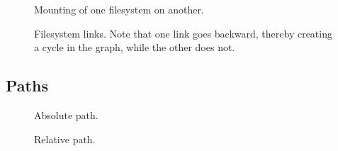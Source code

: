 
\begin{figure}[tbp]
  \begin{center}
  \end{center}
  \caption{Mounting of one filesystem on another.}
  \label{fig:topics:fs:mount}
\end{figure}


\begin{figure}[tbp]
  \begin{center}
  \end{center}
  \caption[Filesystem links]{Filesystem links. Note that one link goes backward, thereby creating a cycle in the graph, while the other does not.}
  \label{fig:topics:fs:links}
\end{figure}

\subsection{Paths}


\begin{figure}[tbp]
  \begin{center}
  \end{center}
  \caption{Absolute path.}
  \label{fig:topics:fs:path:abs}
\end{figure}


\begin{figure}[tbp]
  \begin{center}
  \end{center}
  \caption{Relative path.}
  \label{fig:topics:fs:path:rel}
\end{figure}

